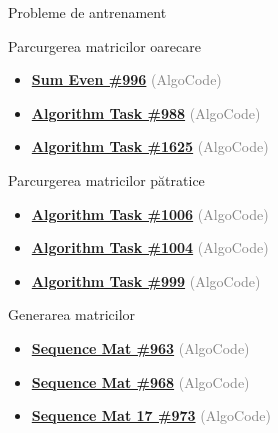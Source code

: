 ﻿\documentclass{beamer}
\begin{document}
\begin{frame}{Probleme de antrenament}
  \begin{block}{Parcurgerea matricilor oarecare}
    \begin{itemize}\footnotesize\itemsep0pt
      \item \href{https://code.algolymp.com/problems/996}{\textbf{Sum Even \#996}} {\footnotesize\textcolor{gray}{(AlgoCode)}}
      \item \href{https://code.algolymp.com/problems/988}{\textbf{Algorithm Task \#988}} {\footnotesize\textcolor{gray}{(AlgoCode)}}
      \item \href{https://code.algolymp.com/problems/1625}{\textbf{Algorithm Task \#1625}} {\footnotesize\textcolor{gray}{(AlgoCode)}}
    \end{itemize}
  \end{block}
  \vspace{-4pt}
  \begin{block}{Parcurgerea matricilor pătratice}
    \begin{itemize}\footnotesize\itemsep0pt
      \item \href{https://code.algolymp.com/problems/1006}{\textbf{Algorithm Task \#1006}} {\footnotesize\textcolor{gray}{(AlgoCode)}}
      \item \href{https://code.algolymp.com/problems/1004}{\textbf{Algorithm Task \#1004}} {\footnotesize\textcolor{gray}{(AlgoCode)}}
      \item \href{https://code.algolymp.com/problems/999}{\textbf{Algorithm Task \#999}} {\footnotesize\textcolor{gray}{(AlgoCode)}}
    \end{itemize}
  \end{block}
  \vspace{-4pt}
  \begin{block}{Generarea matricilor}
    \begin{itemize}\footnotesize\itemsep0pt
      \item \href{https://code.algolymp.com/problems/963}{\textbf{Sequence Mat \#963}} {\footnotesize\textcolor{gray}{(AlgoCode)}}
      \item \href{https://code.algolymp.com/problems/968}{\textbf{Sequence Mat \#968}} {\footnotesize\textcolor{gray}{(AlgoCode)}}
      \item \href{https://code.algolymp.com/problems/973}{\textbf{Sequence Mat 17 \#973}} {\footnotesize\textcolor{gray}{(AlgoCode)}}
    \end{itemize}
  \end{block}
\end{frame}
\end{document}
